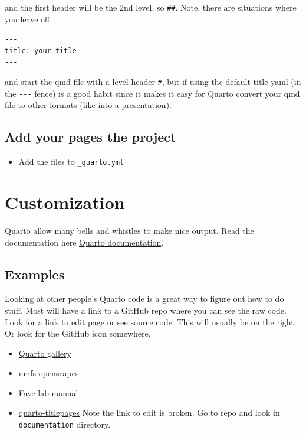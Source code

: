 \documentclass[
  letterpaper,
  oneside,
  open=any]{scrbook}
\providecommand{\tightlist}{%
  \setlength{\itemsep}{0pt}\setlength{\parskip}{0pt}}\usepackage{longtable,booktabs,array}
\begin{document}
and the first header will be the 2nd level, so \texttt{\#\#}. Note,
there are situations where you leave off

\begin{verbatim}
---
title: your title
---
\end{verbatim}

and start the qmd file with a level header \texttt{\#}, but if using the
default title yaml (in the \texttt{-\/-\/-} fence) is a good habit since
it makes it easy for Quarto convert your qmd file to other formats (like
into a presentation).

\hypertarget{add-your-pages-the-project}{%
\section{Add your pages the project}\label{add-your-pages-the-project}}

\begin{itemize}
\tightlist
\item
  Add the files to \texttt{\_quarto.yml}
\end{itemize}


\hypertarget{customization}{%
\chapter{Customization}\label{customization}}

Quarto allow many bells and whistles to make nice output. Read the
documentation here \href{https://quarto.org/docs/guide/}{Quarto
documentation}.

\hypertarget{examples}{%
\section{Examples}\label{examples}}

Looking at other people's Quarto code is a great way to figure out how
to do stuff. Most will have a link to a GitHub repo where you can see
the raw code. Look for a link to edit page or see source code. This will
usually be on the right. Or look for the GitHub icon somewhere.

\begin{itemize}
\tightlist
\item
  \href{https://quarto.org/docs/gallery/}{Quarto gallery}
\item
  \href{https://nmfs-openscapes.github.io/}{nmfs-openscapes}
\item
  \href{https://thefaylab.github.io/lab-manual/}{Faye lab manual}
\item
  \href{https://nmfs-opensci.github.io/quarto_titlepages/}{quarto-titlepages}
  Note the link to edit is broken. Go to repo and look in
  \texttt{documentation} directory.
\end{itemize}
\end{document}
